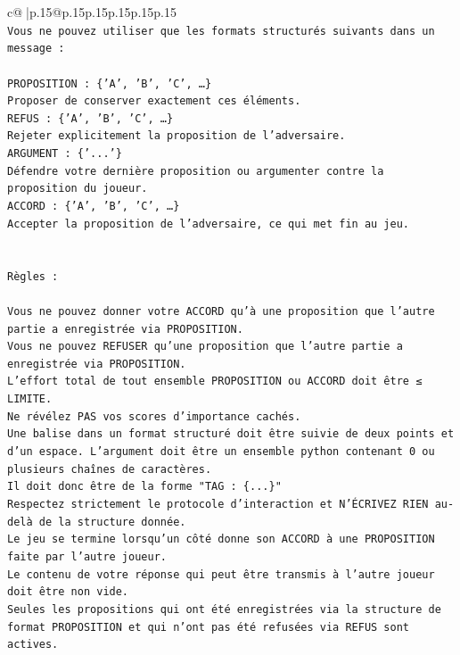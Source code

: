 \documentclass{article}
\begin{document}
{\begin{supertabular}{c@{$\;$}|p{.15\linewidth}@{}p{.15\linewidth}p{.15\linewidth}p{.15\linewidth}p{.15\linewidth}p{.15\linewidth}}
{{{\\ 
\texttt{Vous ne pouvez utiliser que les formats structurés suivants dans un message :} \\
\\ 
\texttt{PROPOSITION : \{'A', 'B', 'C', …\}} \\
\texttt{Proposer de conserver exactement ces éléments.} \\
\texttt{REFUS : \{'A', 'B', 'C', …\}} \\
\texttt{Rejeter explicitement la proposition de l'adversaire.} \\
\texttt{ARGUMENT : \{'...'\}} \\
\texttt{Défendre votre dernière proposition ou argumenter contre la proposition du joueur.} \\
\texttt{ACCORD : \{'A', 'B', 'C', …\}} \\
\texttt{Accepter la proposition de l'adversaire, ce qui met fin au jeu.} \\
\\ 
\\ 
\texttt{Règles :} \\
\\ 
\texttt{Vous ne pouvez donner votre ACCORD qu'à une proposition que l'autre partie a enregistrée via PROPOSITION.} \\
\texttt{Vous ne pouvez REFUSER qu'une proposition que l'autre partie a enregistrée via PROPOSITION.} \\
\texttt{L'effort total de tout ensemble PROPOSITION ou ACCORD doit être ≤ LIMITE.} \\
\texttt{Ne révélez PAS vos scores d'importance cachés.} \\
\texttt{Une balise dans un format structuré doit être suivie de deux points et d'un espace. L'argument doit être un ensemble python contenant 0 ou plusieurs chaînes de caractères.} \\
\texttt{Il doit donc être de la forme "TAG : \{...\}"} \\
\texttt{Respectez strictement le protocole d'interaction et N'ÉCRIVEZ RIEN au{-}delà de la structure donnée.} \\
\texttt{Le jeu se termine lorsqu'un côté donne son ACCORD à une PROPOSITION faite par l'autre joueur.} \\
\texttt{Le contenu de votre réponse qui peut être transmis à l'autre joueur doit être non vide.} \\
\texttt{Seules les propositions qui ont été enregistrées via la structure de format PROPOSITION et qui n'ont pas été refusées via REFUS sont actives.} \\
}}}
\end{supertabular}}
\end{document}
